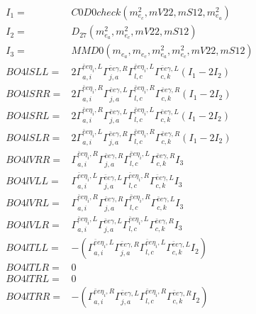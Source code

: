 \documentclass[A4,landscape]{article}
\begin{document}
\begin{align} 
I_1 = & C0D0check(m^2_{e_{{c}}}, mV22, mS12, m^2_{e_{{a}}}) \\ 
I_2 = & D_{27}(m^2_{e_{{a}}}, m^2_{e_{{c}}}, mV22, mS12) \\ 
I_3 = & MMD0(m_{e_{{a}}}, m_{e_{{c}}}, m^2_{e_{{a}}}, m^2_{e_{{c}}}, mV22, mS12) \\ 
  BO4lSLL= & 2  \Gamma^{\bar{e}e \eta_i ,L}_{a, i} \Gamma^{\bar{e}e \gamma ,R}_{j, a} \Gamma^{\bar{e}e \eta_i ,L}_{l, c} \Gamma^{\bar{e}e \gamma ,L}_{c, k} (I_1 - 2 I_2) \\ 
  BO4lSRR= & 2  \Gamma^{\bar{e}e \eta_i ,R}_{a, i} \Gamma^{\bar{e}e \gamma ,L}_{j, a} \Gamma^{\bar{e}e \eta_i ,R}_{l, c} \Gamma^{\bar{e}e \gamma ,R}_{c, k} (I_1 - 2 I_2) \\ 
  BO4lSRL= & 2  \Gamma^{\bar{e}e \eta_i ,R}_{a, i} \Gamma^{\bar{e}e \gamma ,L}_{j, a} \Gamma^{\bar{e}e \eta_i ,L}_{l, c} \Gamma^{\bar{e}e \gamma ,L}_{c, k} (I_1 - 2 I_2) \\ 
  BO4lSLR= & 2  \Gamma^{\bar{e}e \eta_i ,L}_{a, i} \Gamma^{\bar{e}e \gamma ,R}_{j, a} \Gamma^{\bar{e}e \eta_i ,R}_{l, c} \Gamma^{\bar{e}e \gamma ,R}_{c, k} (I_1 - 2 I_2) \\ 
  BO4lVRR= &  \Gamma^{\bar{e}e \eta_i ,R}_{a, i} \Gamma^{\bar{e}e \gamma ,R}_{j, a} \Gamma^{\bar{e}e \eta_i ,L}_{l, c} \Gamma^{\bar{e}e \gamma ,R}_{c, k} I_3 \\ 
  BO4lVLL= &  \Gamma^{\bar{e}e \eta_i ,L}_{a, i} \Gamma^{\bar{e}e \gamma ,L}_{j, a} \Gamma^{\bar{e}e \eta_i ,R}_{l, c} \Gamma^{\bar{e}e \gamma ,L}_{c, k} I_3 \\ 
  BO4lVRL= &  \Gamma^{\bar{e}e \eta_i ,R}_{a, i} \Gamma^{\bar{e}e \gamma ,R}_{j, a} \Gamma^{\bar{e}e \eta_i ,R}_{l, c} \Gamma^{\bar{e}e \gamma ,L}_{c, k} I_3 \\ 
  BO4lVLR= &  \Gamma^{\bar{e}e \eta_i ,L}_{a, i} \Gamma^{\bar{e}e \gamma ,L}_{j, a} \Gamma^{\bar{e}e \eta_i ,L}_{l, c} \Gamma^{\bar{e}e \gamma ,R}_{c, k} I_3 \\ 
  BO4lTLL= & -( \Gamma^{\bar{e}e \eta_i ,L}_{a, i} \Gamma^{\bar{e}e \gamma ,R}_{j, a} \Gamma^{\bar{e}e \eta_i ,L}_{l, c} \Gamma^{\bar{e}e \gamma ,L}_{c, k} I_2) \\ 
  BO4lTLR= & 0 \\ 
  BO4lTRL= & 0 \\ 
  BO4lTRR= & -( \Gamma^{\bar{e}e \eta_i ,R}_{a, i} \Gamma^{\bar{e}e \gamma ,L}_{j, a} \Gamma^{\bar{e}e \eta_i ,R}_{l, c} \Gamma^{\bar{e}e \gamma ,R}_{c, k} I_2) \\ 
\end{align} 
\end{document}

